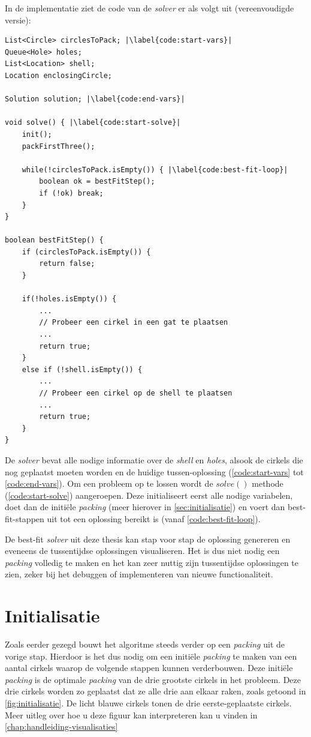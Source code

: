 \documentclass[12pt,a4paper,oneside]{book}
\begin{document}
{In de implementatie ziet de code van de \textit{solver} er als volgt uit (vereenvoudigde versie):

\begin{lstlisting}
List<Circle> circlesToPack; |\label{code:start-vars}|
Queue<Hole> holes;
List<Location> shell;
Location enclosingCircle;

Solution solution; |\label{code:end-vars}|

void solve() { |\label{code:start-solve}|
	init();
	packFirstThree();
	
	while(!circlesToPack.isEmpty()) { |\label{code:best-fit-loop}|
		boolean ok = bestFitStep();
		if (!ok) break;
	}
}

boolean bestFitStep() {
	if (circlesToPack.isEmpty()) {
		return false;
	}
	
	if(!holes.isEmpty()) {
		...
		// Probeer een cirkel in een gat te plaatsen
		...
		return true;
	}
	else if (!shell.isEmpty()) {
		...
		// Probeer een cirkel op de shell te plaatsen
		...
		return true;
	}
}
\end{lstlisting}

De \textit{solver} bevat alle nodige informatie over de \textit{shell} en \textit{holes}, alsook de cirkels die nog geplaatst moeten worden en de huidige tussen-oplossing (\autoref{code:start-vars} tot \autoref{code:end-vars}).
Om een probleem op te lossen wordt de $solve()$ methode (\autoref{code:start-solve}) aangeroepen.
Deze initialiseert eerst alle nodige variabelen, doet dan de initiële \textit{packing} (meer hierover in \autoref{sec:initialisatie}) en voert dan best-fit-stappen uit tot een oplossing bereikt is (vanaf \autoref{code:best-fit-loop}).

De best-fit \textit{solver} uit deze thesis kan stap voor stap de oplossing genereren en eveneens de tussentijdse oplossingen visualiseren.
Het is dus niet nodig een \textit{packing} volledig te maken en het kan zeer nuttig zijn tussentijdse oplossingen te zien, zeker bij het debuggen of implementeren van nieuwe functionaliteit.

\section{Initialisatie} \label{sec:initialisatie}

Zoals eerder gezegd bouwt het algoritme steeds verder op een \textit{packing} uit de vorige stap.
Hierdoor is het dus nodig om een initiële \textit{packing} te maken van een aantal cirkels waarop de volgende stappen kunnen verderbouwen.
Deze initiële \textit{packing} is de optimale \textit{packing} van de drie grootste cirkels in het probleem.
Deze drie cirkels worden zo geplaatst dat ze alle drie aan elkaar raken, zoals getoond in \autoref{fig:initialisatie}.
De licht blauwe cirkels tonen de drie eerste-geplaatste cirkels.
Meer uitleg over hoe u deze figuur kan interpreteren kan u vinden in \autoref{chap:handleiding-visualisaties}

}
\end{document}
